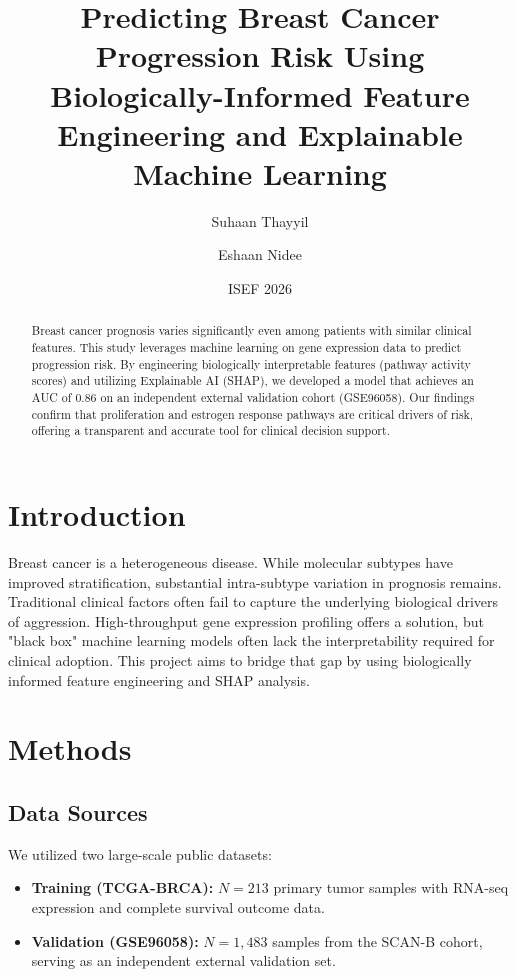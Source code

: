 \documentclass{article}
\title{Predicting Breast Cancer Progression Risk Using Biologically-Informed Feature Engineering and Explainable Machine Learning}
\author{Suhaan Thayyil \and Eshaan Nidee}
\date{ISEF 2026}
\begin{document}
\maketitle

\begin{abstract}
Breast cancer prognosis varies significantly even among patients with similar clinical features. This study leverages machine learning on gene expression data to predict progression risk. By engineering biologically interpretable features (pathway activity scores) and utilizing Explainable AI (SHAP), we developed a model that achieves an AUC of 0.86 on an independent external validation cohort (GSE96058). Our findings confirm that proliferation and estrogen response pathways are critical drivers of risk, offering a transparent and accurate tool for clinical decision support.
\end{abstract}

\section{Introduction}
Breast cancer is a heterogeneous disease. While molecular subtypes have improved stratification, substantial intra-subtype variation in prognosis remains. Traditional clinical factors often fail to capture the underlying biological drivers of aggression. High-throughput gene expression profiling offers a solution, but "black box" machine learning models often lack the interpretability required for clinical adoption. This project aims to bridge that gap by using biologically informed feature engineering and SHAP analysis.

\section{Methods}

\subsection{Data Sources}
We utilized two large-scale public datasets:
\begin{itemize}
    \item \textbf{Training (TCGA-BRCA):} $N=213$ primary tumor samples with RNA-seq expression and complete survival outcome data.
    \item \textbf{Validation (GSE96058):} $N=1,483$ samples from the SCAN-B cohort, serving as an independent external validation set.
\end{itemize}
\end{document}
